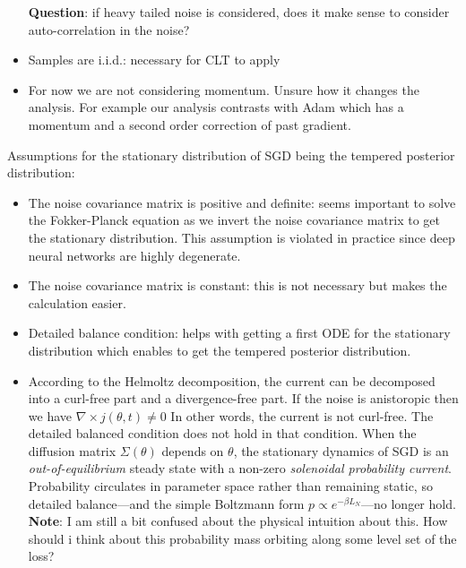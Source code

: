 \documentclass[11pt]{article}
\begin{document}
\begin{itemize}
    \textbf{Question}: if heavy tailed noise is considered, does it make sense to consider auto-correlation in the noise?
    \item Samples are i.i.d.: necessary for CLT to apply
    \item For now we are not considering momentum. Unsure how it changes the analysis. For example our analysis contrasts with Adam which has a momentum and a second order correction of past gradient.
\end{itemize}
Assumptions for the stationary distribution of SGD being the tempered posterior distribution:
\begin{itemize}
    \item The noise covariance matrix is positive and definite: seems important to solve the Fokker-Planck equation as we invert the noise covariance matrix to get the stationary distribution. This assumption is violated in practice since deep neural networks are highly degenerate.
    \item The noise covariance matrix is constant: this is not necessary but makes the calculation easier.
    \item Detailed balance condition: helps with getting a first ODE for the stationary distribution which enables to get the tempered posterior distribution.
    \item According to the Helmoltz decomposition, the current can be decomposed into a curl-free part and a divergence-free part. If the noise is anistoropic then we have $\nabla \times j(\theta, t) \neq 0$ In other words, the current is not curl-free. The detailed balanced condition does not hold in that condition. When the diffusion matrix $\Sigma(\theta)$ depends on $\theta$, the stationary dynamics of SGD is an \emph{out-of-equilibrium} steady state with a non-zero \emph{solenoidal probability current}. Probability circulates in parameter space rather than remaining static, so detailed balance—and the simple Boltzmann form $p \propto e^{-\beta L_N}$—no longer hold. \textbf{Note}: I am still a bit confused about the physical intuition about this. How should i think about this probability mass orbiting along some level set of the loss?
\end{itemize}
\end{document}
